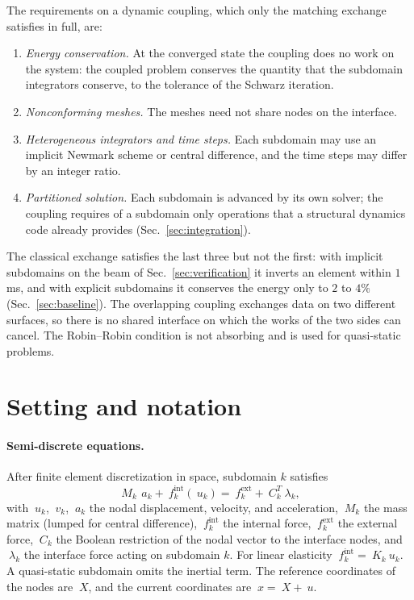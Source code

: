 \documentclass[11pt]{article}
\begin{document}
The requirements on a dynamic coupling, which only the matching exchange
satisfies in full, are:
\begin{enumerate}[itemsep=2pt]
\item \emph{Energy conservation.} At the converged state the coupling does
  no work on the system: the coupled problem conserves the quantity that
  the subdomain integrators conserve, to the tolerance of the Schwarz
  iteration.
\item \emph{Nonconforming meshes.} The meshes need not share nodes on the
  interface.
\item \emph{Heterogeneous integrators and time steps.} Each subdomain may use
  an implicit Newmark scheme or central difference, and the time steps may
  differ by an integer ratio.
\item \emph{Partitioned solution.} Each subdomain is advanced by its own
  solver; the coupling requires of a subdomain only operations that a
  structural dynamics code already provides (Sec.~\ref{sec:integration}).
\end{enumerate}
The classical exchange satisfies the last three but not the first: with
implicit subdomains on the beam of Sec.~\ref{sec:verification} it inverts
an element within $1$\,ms, and with explicit subdomains it conserves the
energy only to $2$ to $4\%$ (Sec.~\ref{sec:baseline}). The overlapping
coupling exchanges data on two different surfaces, so there is no shared
interface on which the works of the two sides can cancel. The Robin--Robin
condition is not absorbing and is used for quasi-static problems.

\section{Setting and notation}
\label{sec:setting}

\paragraph{Semi-discrete equations.} After finite element discretization
in space, subdomain $k$ satisfies
\begin{equation}
  ~M_k\, ~a_k + ~f^{\mathrm{int}}_k(~u_k)
  = ~f^{\mathrm{ext}}_k + ~C_k^T ~\lambda_k ,
  \label{eq:motion}
\end{equation}
with $~u_k$, $~v_k$, $~a_k$ the nodal displacement, velocity, and
acceleration, $~M_k$ the mass matrix (lumped for central difference),
$~f^{\mathrm{int}}_k$ the internal force, $~f^{\mathrm{ext}}_k$ the external
force, $~C_k$ the Boolean restriction of the nodal vector to the interface
nodes, and $~\lambda_k$ the interface force acting on subdomain $k$. For
linear elasticity $~f^{\mathrm{int}}_k = ~K_k ~u_k$. A quasi-static
subdomain omits the inertial term. The reference coordinates of the nodes
are $~X$, and the current coordinates are $~x = ~X + ~u$.
\end{document}
